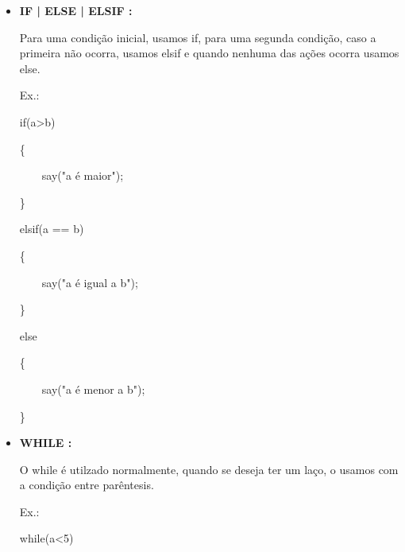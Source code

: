 \documentclass[a4paper]{article}
\begin{document}
{{{{{\begin{itemize}
            \textcolor{NavyBlue}{Ex.:}
            \textcolor{NavyBlue}{say(variavel)}
            ;
            
            \textcolor{NavyBlue}{Ex.:}
            \textcolor{NavyBlue}{say("Hello World!")}
            ;
        
            
\newpage %
            
            
        \item \textbf{IF | ELSE | ELSIF : }
            
            Para uma condição inicial, usamos
            \textcolor{NavyBlue}{if},
            para uma segunda condição, caso a 
            primeira não ocorra, usamos
            \textcolor{NavyBlue}{elsif}
            e quando nenhuma das ações ocorra
            usamos 
            \textcolor{NavyBlue}{else}.
            
            \textcolor{NavyBlue}{Ex.:}
            
            \textcolor{NavyBlue}{if(a>b)}
            
            \{
            
            \ \ \ \  say("a é maior");
            
            \}
            
            \textcolor{NavyBlue}{elsif(a == b)}
            
            \{
            
            \ \ \ \ say("a é igual a b");
            
            \}
            
            \textcolor{NavyBlue}{else}
            
            \{
            
            \ \ \ \  say("a é menor a b");
            
            \}
    
        \bigskip    
            
        \item \textbf{WHILE :}
            
            O while é utilzado normalmente, quando se
            deseja ter um laço, o usamos com a condição
            entre parêntesis.
        
            \textcolor{NavyBlue}{Ex.:}
            
            \textcolor{NavyBlue}{while(a<5)}
            

\end{itemize}}}}}}
\end{document}
